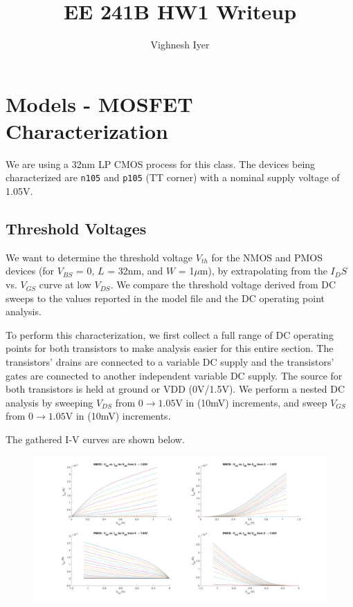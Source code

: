 \documentclass[11pt]{article}
\begin{document}
\title{EE 241B HW1 Writeup}

\author{Vighnesh Iyer}
\date{}
\maketitle

\tableofcontents

\section{Models - MOSFET Characterization}

We are using a 32nm LP CMOS process for this class. The devices being characterized are \verb|n105| and \verb|p105| (TT corner) with a nominal supply voltage of 1.05V.

\subsection{Threshold Voltages}
We want to determine the threshold voltage $V_{th}$ for the NMOS and PMOS devices (for $V_{BS}$ = 0, $L$ = 32nm, and $W$ = 1$\mu$m), by extrapolating from the $I_DS$ vs. $V_{GS}$ curve at low $V_{DS}$. We compare the threshold voltage derived from DC sweeps to the values reported in the model file and the DC operating point analysis.

To perform this characterization, we first collect a full range of DC operating points for both transistors to make analysis easier for this entire section. The transistors' drains are connected to a variable DC supply and the transistors' gates are connected to another independent variable DC supply. The source for both transistors is held at ground or VDD (0V/1.5V). We perform a nested DC analysis by sweeping $V_{DS}$ from $0 \rightarrow 1.05$V in (10mV) increments, and sweep $V_{GS}$ from $0 \rightarrow 1.05$V in (10mV) increments.

The gathered I-V curves are shown below.

\begin{figure}[H]
	\centerline{\includegraphics[width=\textwidth+5cm]{images/dc_curves.png}}	
\end{figure}
\end{document}
